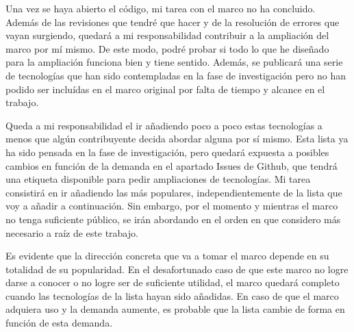 Una vez se haya abierto el código, mi tarea con el marco no ha concluido. Además de las revisiones que tendré que hacer y de la resolución de errores que vayan surgiendo, quedará a mi responsabilidad contribuir a la ampliación del marco por mí mismo. De este modo, podré probar si todo lo que he diseñado para la ampliación funciona bien y tiene sentido. Además, se publicará una serie de tecnologías que han sido contempladas en la fase de investigación pero no han podido ser incluídas en el marco original por falta de tiempo y alcance en el trabajo.

Queda a mi responsabilidad el ir añadiendo poco a poco estas tecnologías a menos que algún contribuyente decida abordar alguna por sí mismo. Esta lista ya ha sido pensada en la fase de investigación, pero quedará expuesta a posibles cambios en función de la demanda en el apartado Issues de Github, que tendrá una etiqueta disponible para pedir ampliaciones de tecnologías. Mi tarea consistirá en ir añadiendo las más populares, independientemente de la lista que voy a añadir a continuación. Sin embargo, por el momento y mientras el marco no tenga suficiente público, se irán abordando en el orden en que considero más necesario a raíz de este trabajo.

Es evidente que la dirección concreta que va a tomar el marco depende en su totalidad de su popularidad. En el desafortunado caso de que este marco no logre darse a conocer o no logre ser de suficiente utilidad, el marco quedará completo cuando las tecnologías de la lista hayan sido añadidas. En caso de que el marco adquiera uso y la demanda aumente, es probable que la lista cambie de forma en función de esta demanda.

